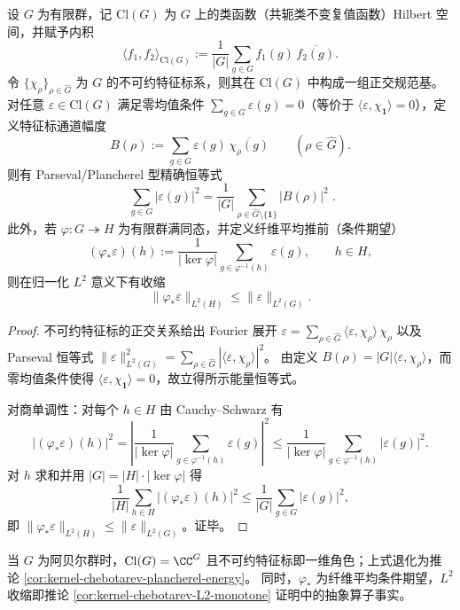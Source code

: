 \begin{proposition}\label{prop:kernel-chebotarev-plancherel-nonabelian}
设 \(G\) 为有限群，记 \(\mathrm{Cl}(G)\) 为 \(G\) 上的类函数（共轭类不变复值函数）Hilbert 空间，并赋予内积
\[
\langle f_1,f_2\rangle_{\mathrm{Cl}(G)}
:=\frac{1}{|G|}\sum_{g\in G} f_1(g)\,\overline{f_2(g)}.
\]
令 \(\{\chi_\rho\}_{\rho\in\widehat G}\) 为 \(G\) 的不可约特征标系，则其在 \(\mathrm{Cl}(G)\) 中构成一组正交规范基。
对任意 \(\varepsilon\in \mathrm{Cl}(G)\) 满足零均值条件 \(\sum_{g\in G}\varepsilon(g)=0\)（等价于 \(\langle \varepsilon,\chi_{\mathbf{1}}\rangle=0\)），定义特征标通道幅度
\[
B(\rho):=\sum_{g\in G}\varepsilon(g)\,\overline{\chi_\rho(g)}
\qquad(\rho\in\widehat G).
\]
则有 Parseval/Plancherel 型精确恒等式
\[
\boxed{\;
\sum_{g\in G}\bigl|\varepsilon(g)\bigr|^2
=\frac{1}{|G|}\sum_{\rho\in\widehat G\setminus\{\mathbf{1}\}}\bigl|B(\rho)\bigr|^2\; }.
\]
此外，若 \(\varphi:G\twoheadrightarrow H\) 为有限群满同态，并定义纤维平均推前（条件期望）
\[
(\varphi_\ast\varepsilon)(h):=\frac{1}{|\ker\varphi|}\sum_{g\in \varphi^{-1}(h)}\varepsilon(g),
\qquad h\in H,
\]
则在归一化 \(L^2\) 意义下有收缩
\[
\bigl\|\varphi_\ast\varepsilon\bigr\|_{L^2(H)}
\le
\bigl\|\varepsilon\bigr\|_{L^2(G)}.
\]
\end{proposition}

\begin{proof}
不可约特征标的正交关系给出 Fourier 展开
\(
\varepsilon=\sum_{\rho\in\widehat G}\langle \varepsilon,\chi_\rho\rangle\,\chi_\rho
\)
以及 Parseval 恒等式
\(
\|\varepsilon\|_{L^2(G)}^2=\sum_{\rho\in\widehat G}|\langle \varepsilon,\chi_\rho\rangle|^2
\)。
由定义 \(B(\rho)=|G|\langle \varepsilon,\chi_\rho\rangle\)，而零均值条件使得 \(\langle \varepsilon,\chi_{\mathbf{1}}\rangle=0\)，故立得所示能量恒等式。

对商单调性：对每个 \(h\in H\) 由 Cauchy--Schwarz 有
\[
\bigl|(\varphi_\ast\varepsilon)(h)\bigr|^2
=\left|\frac{1}{|\ker\varphi|}\sum_{g\in\varphi^{-1}(h)}\varepsilon(g)\right|^2
\le
\frac{1}{|\ker\varphi|}\sum_{g\in\varphi^{-1}(h)}|\varepsilon(g)|^2.
\]
对 \(h\) 求和并用 \(|G|=|H|\cdot|\ker\varphi|\) 得
\[
\frac{1}{|H|}\sum_{h\in H}\bigl|(\varphi_\ast\varepsilon)(h)\bigr|^2
\le
\frac{1}{|G|}\sum_{g\in G}|\varepsilon(g)|^2,
\]
即 \(\|\varphi_\ast\varepsilon\|_{L^2(H)}\le \|\varepsilon\|_{L^2(G)}\)。证毕。
\end{proof}

\begin{remark}[对照：阿贝尔情形即角色基能量分解]\label{rem:kernel-chebotarev-plancherel-nonabelian-abelian}
当 \(G\) 为阿贝尔群时，\(\mathrm{Cl}(G)=\CC^{G}\) 且不可约特征标即一维角色；上式退化为推论 \ref{cor:kernel-chebotarev-plancherel-energy}。
同时，\(\varphi_\ast\) 为纤维平均条件期望，\(L^2\) 收缩即推论 \ref{cor:kernel-chebotarev-L2-monotone} 证明中的抽象算子事实。
\end{remark}

